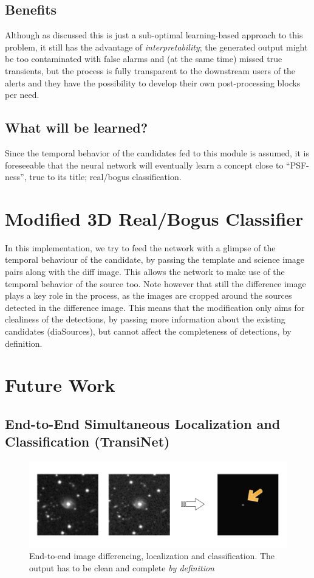 \subsection{Benefits}
\label{sec:rb_benefits}

Although as discussed this is just a sub-optimal learning-based approach to this problem, it still has the advantage of \emph{interpretability}; the generated output might be too contaminated with false alarms and (at the same time) missed true transients, but the process is fully transparent to the downstream users of the alerts and they have the possibility to develop their own post-processing blocks per need.


\subsection{What will be learned?}
Since the temporal behavior of the candidates fed to this module is assumed, it is foreseeable that the neural network will eventually learn a concept close to ``PSF-ness'', true to its title; real/bogus classification.

\section{Modified 3D Real/Bogus Classifier}
\label{sec:modified}
In this implementation, we try to feed the network with a glimpse of the temporal behaviour of the candidate, by passing the template and science image pairs along with the diff image. This allows the network to make use of the temporal behavior of the source too.
Note however that still the difference image plays a key role in the process, as the images are cropped around the sources detected in the difference image. This means that the modification only aims for clealiness of the detections, by passing more information about the existing candidates (diaSources), but cannot affect the completeness of detections, by definition.

\section{Future Work}
\subsection{End-to-End Simultaneous Localization and Classification (TransiNet)}

\begin{figure}[h]
  \centering
  \includegraphics[width=.8\textwidth]{material/transinet-teaser}
  \caption{End-to-end image differencing, localization and classification. The output has to be clean and complete \emph{by definition} }
  \label{fig:transinet-teaser}
\end{figure}

